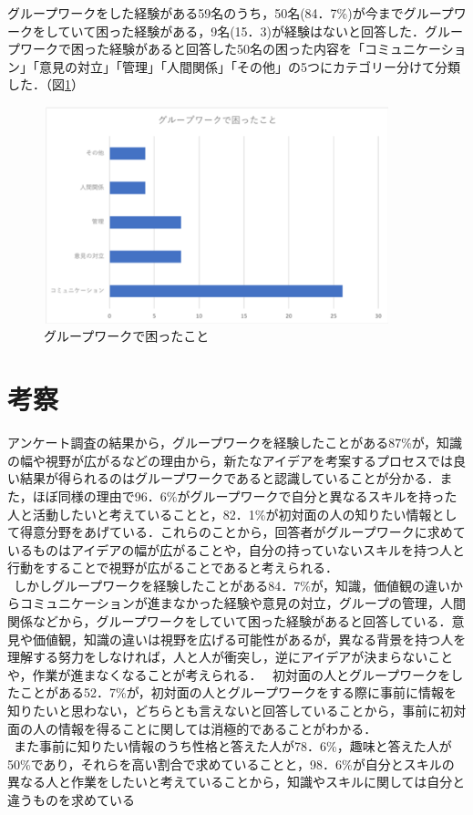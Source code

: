 \documentclass{funthesis}
\begin{document}
グループワークをした経験がある59名のうち，50名(84．7\%)が今までグループワークをしていて困った経験がある，9名(15．3)が経験はないと回答した．グループワークで困った経験があると回答した50名の困った内容を「コミュニケーション」「意見の対立」「管理」「人間関係」「その他」の5つにカテゴリー分けて分類した．（図\ref{graph4}）

\begin{figure}[h]
 \centering
   \includegraphics[width=100mm]{figures/graph4.png}
 \caption{グループワークで困ったこと}
 \label{graph4}
\end{figure}


\section{考察}

アンケート調査の結果から，グループワークを経験したことがある87\%が，知識の幅や視野が広がるなどの理由から，新たなアイデアを考案するプロセスでは良い結果が得られるのはグループワークであると認識していることが分かる．また，ほぼ同様の理由で96．6\%がグループワークで自分と異なるスキルを持った人と活動したいと考えていることと，82．1\%が初対面の人の知りたい情報として得意分野をあげている．これらのことから，回答者がグループワークに求めているものはアイデアの幅が広がることや，自分の持っていないスキルを持つ人と行動をすることで視野が広がることであると考えられる．\\
\ しかしグループワークを経験したことがある84．7\%が，知識，価値観の違いからコミュニケーションが進まなかった経験や意見の対立，グループの管理，人間関係などから，グループワークをしていて困った経験があると回答している．意見や価値観，知識の違いは視野を広げる可能性があるが，異なる背景を持つ人を理解する努力をしなければ，人と人が衝突し，逆にアイデアが決まらないことや，作業が進まなくなることが考えられる．
\ 初対面の人とグループワークをしたことがある52．7\%が，初対面の人とグループワークをする際に事前に情報を知りたいと思わない，どちらとも言えないと回答していることから，事前に初対面の人の情報を得ることに関しては消極的であることがわかる．\\
\ また事前に知りたい情報のうち性格と答えた人が78．6\%，趣味と答えた人が50\%であり，それらを高い割合で求めていることと，98．6\%が自分とスキルの異なる人と作業をしたいと考えていることから，知識やスキルに関しては自分と違うものを求めている
\end{document}
